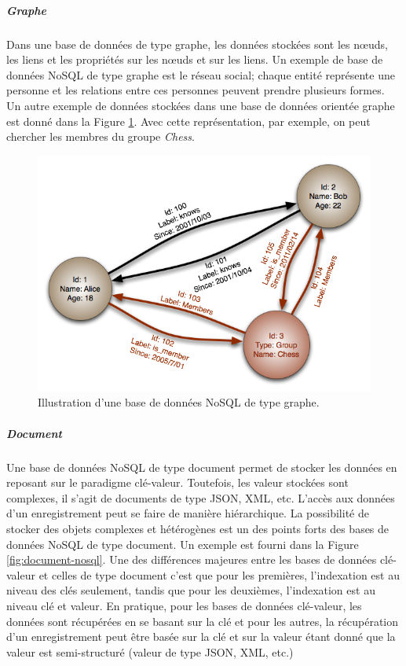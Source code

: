 	\subparagraph{Graphe} Dans une base de données de type graphe, les données stockées sont les n\oe{}uds, les liens et les propriétés sur les n\oe{}uds et sur les liens. Un exemple  de base de données NoSQL de type graphe est le réseau social; chaque entité représente une personne et les relations entre ces personnes peuvent prendre plusieurs formes. Un autre exemple de données stockées  dans une base de données orientée graphe est donné dans la Figure  	\ref{fig:graphe-nosql}. Avec cette représentation, par exemple, on peut chercher les membres du groupe \textit{Chess}.  
\begin{figure}[h]
	\centering
	\captionsetup{justification= centering}
	\includegraphics[width=.8\linewidth]{illustrations/GraphDatabase_PropertyGraph.png}		
	\caption{Illustration d'une base de données NoSQL de type graphe. }
	\label{fig:graphe-nosql}
\end{figure}
		\subparagraph{Document} Une base de données NoSQL de type document permet de stocker les données en reposant sur le paradigme clé-valeur. Toutefois, les valeur stockées sont complexes, il s'agit de documents de type JSON, XML, etc. L'accès aux données d'un enregistrement peut se faire de manière hiérarchique. La possibilité de stocker des objets complexes et hétérogènes  est un des points forts des bases de données NoSQL de type  document. Un exemple est fourni dans la Figure \ref{fig:document-nosql}. Une des différences majeures entre les bases de données clé-valeur et celles de type document c'est que pour les premières, l'indexation est au niveau  des clés seulement, tandis que pour les deuxièmes, l'indexation est au niveau clé et valeur. En pratique, pour les bases de données clé-valeur, les données sont récupérées en se basant sur la clé et pour les autres, la récupération d'un enregistrement peut être basée sur la clé et sur la valeur étant donné que la valeur est semi-structuré (valeur de type JSON, XML, etc.)
